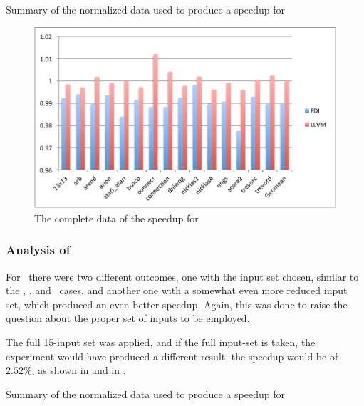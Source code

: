 \begin{table}
  \centering
  \begin{tiny}
  
  \end{tiny}
  \caption{Summary of the normalized data used to produce a speedup for \gcc}
  \label{tab:fullspeedupgbk}
\end{table}

\begin{figure}
  \centering
  \includegraphics[width=1.00\linewidth]{Figures/speedupgbkall}
  \caption{The complete data of the speedup for \gobmk}
  \label{fig:gobmkall}
\end{figure}


\subsubsection{Analysis of \gcc}

For \gcc\ there were two different outcomes, one with the input set chosen, similar to the \bzip, \gzip, and \gobmk\ cases, and another one with a somewhat even more reduced input set, which produced an even better speedup. Again, this was done to raise the question about the proper set of inputs to be employed.

The full 15-input set was applied, and if the full input-set is taken, the experiment would have produced a different result, the speedup would be of $2.52 \%$, as shown in  and in .

\begin{table}
  \centering
  \begin{tiny}
  
  \end{tiny}
  \caption{Summary of the normalized data used to produce a speedup for \gcc}
  \label{tab:fullspeedup}
\end{table}

